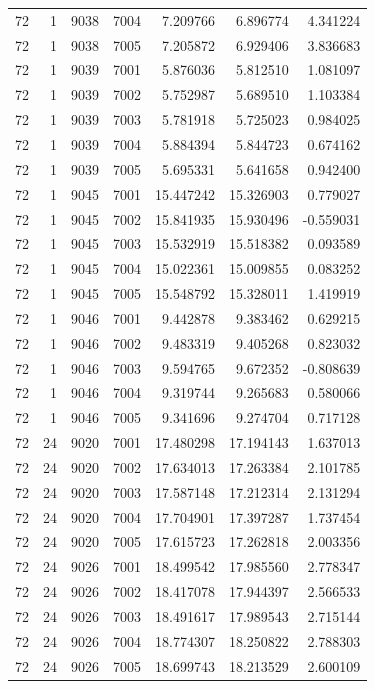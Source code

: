 \begin{table}
\begin{tabular}{rrrrrrr}
72 & 1 & 9038 & 7004 & 7.209766 & 6.896774 & 4.341224 \\
72 & 1 & 9038 & 7005 & 7.205872 & 6.929406 & 3.836683 \\
72 & 1 & 9039 & 7001 & 5.876036 & 5.812510 & 1.081097 \\
72 & 1 & 9039 & 7002 & 5.752987 & 5.689510 & 1.103384 \\
72 & 1 & 9039 & 7003 & 5.781918 & 5.725023 & 0.984025 \\
72 & 1 & 9039 & 7004 & 5.884394 & 5.844723 & 0.674162 \\
72 & 1 & 9039 & 7005 & 5.695331 & 5.641658 & 0.942400 \\
72 & 1 & 9045 & 7001 & 15.447242 & 15.326903 & 0.779027 \\
72 & 1 & 9045 & 7002 & 15.841935 & 15.930496 & -0.559031 \\
72 & 1 & 9045 & 7003 & 15.532919 & 15.518382 & 0.093589 \\
72 & 1 & 9045 & 7004 & 15.022361 & 15.009855 & 0.083252 \\
72 & 1 & 9045 & 7005 & 15.548792 & 15.328011 & 1.419919 \\
72 & 1 & 9046 & 7001 & 9.442878 & 9.383462 & 0.629215 \\
72 & 1 & 9046 & 7002 & 9.483319 & 9.405268 & 0.823032 \\
72 & 1 & 9046 & 7003 & 9.594765 & 9.672352 & -0.808639 \\
72 & 1 & 9046 & 7004 & 9.319744 & 9.265683 & 0.580066 \\
72 & 1 & 9046 & 7005 & 9.341696 & 9.274704 & 0.717128 \\
72 & 24 & 9020 & 7001 & 17.480298 & 17.194143 & 1.637013 \\
72 & 24 & 9020 & 7002 & 17.634013 & 17.263384 & 2.101785 \\
72 & 24 & 9020 & 7003 & 17.587148 & 17.212314 & 2.131294 \\
72 & 24 & 9020 & 7004 & 17.704901 & 17.397287 & 1.737454 \\
72 & 24 & 9020 & 7005 & 17.615723 & 17.262818 & 2.003356 \\
72 & 24 & 9026 & 7001 & 18.499542 & 17.985560 & 2.778347 \\
72 & 24 & 9026 & 7002 & 18.417078 & 17.944397 & 2.566533 \\
72 & 24 & 9026 & 7003 & 18.491617 & 17.989543 & 2.715144 \\
72 & 24 & 9026 & 7004 & 18.774307 & 18.250822 & 2.788303 \\
72 & 24 & 9026 & 7005 & 18.699743 & 18.213529 & 2.600109 \\

\end{tabular}
\end{table}
